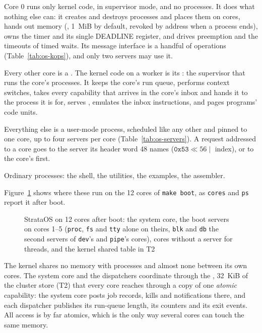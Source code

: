 \begin{description}[leftmargin=1em,style=nextline]
\item[The system core] Core 0 runs only kernel code, in supervisor mode, and no processes. It does
  what nothing else can: it creates and destroys processes and places them on cores, hands out memory
  (, 1~MiB by default, revoked by address when a process ends), owns the timer and its single DEADLINE
  register, and drives preemption and the timeouts of timed waits. Its message interface is a handful
  of operations (Table~\ref{tab:os-kops}), and only two servers may use it.
\item[The dispatchers] Every other core is a . The kernel code on a worker is its
  : the supervisor that runs the core's processes. It keeps the core's run queue,
  performs context switches, takes every capability that arrives in the core's inbox and hands it to
  the process it is for, serves , emulates the inbox instructions, and pages programs' code
  units.
\item[Servers] Everything else is a user-mode  process, scheduled like any other and
  pinned to one core, up to four servers per core (Table~\ref{tab:os-servers}). A request addressed to a
  core goes to the server its header word 48 names ($\texttt{0x53} \ll 56 \mid$ index), or to the
  core's first.
\item[Programs] Ordinary processes: the shell, the utilities, the examples, the assembler.
\end{description}

Figure~\ref{fig:os-cores} shows where these run on the 12 cores of \texttt{make boot}, as \texttt{cores}
and \texttt{ps} report it after boot.

\begin{figure}[htbp]
\centering

\caption{StrataOS on 12 cores after boot: the system core, the boot servers on cores 1--5 (\texttt{proc}, \texttt{fs} and \texttt{tty} alone on theirs, \texttt{blk} and \texttt{db} the second servers of \texttt{dev}'s and \texttt{pipe}'s cores), cores without a server for threads, and the kernel shared table in T2}\label{fig:os-cores}
\end{figure}




The kernel shares no memory with processes and almost none between its own cores. The system core and
the dispatchers coordinate through the , 32~KiB of the cluster store (T2) that
every core reaches through a copy of one \emph{atomic} capability: the system core posts job records, kills
and notifications there, and each dispatcher publishes its run-queue length, its counters and its exit
events. All access is by far atomics, which is the only way several cores can touch the same memory.

